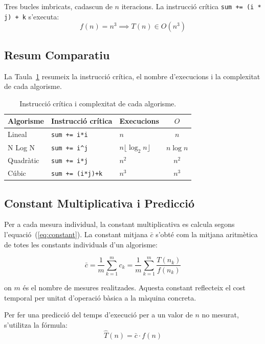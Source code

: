 \documentclass[conference,compsoc]{IEEEtran}
\begin{document}
Tres bucles imbricats, cadascun de $n$ iteracions. La instrucció crítica
\texttt{sum += (i * j) + k} s'executa:
\begin{equation}
f(n) = n^3 \implies T(n) \in O(n^3)
\end{equation}

\subsection{Resum Comparatiu}

La Taula~\ref{tab:critical} resumeix la instrucció crítica, el nombre
d'execucions i la complexitat de cada algorisme.

\begin{table}[H]
\caption{Instrucció crítica i complexitat de cada algorisme.\label{tab:critical}}
\centering
\begin{tabular}{lllc}
\toprule
Algorisme & Instrucció crítica & Execucions & $O$ \\
\midrule
Lineal     & \texttt{sum += i*i}   & $n$                           & $n$ \\
N Log N    & \texttt{sum += i\^{}j}  & $n \lfloor\log_2 n\rfloor$   & $n\log n$ \\
Quadràtic  & \texttt{sum += i*j}   & $n^2$                         & $n^2$ \\
Cúbic      & \texttt{sum += (i*j)+k} & $n^3$                       & $n^3$ \\
\bottomrule
\end{tabular}
\end{table}

\subsection{Constant Multiplicativa i Predicció}

Per a cada mesura individual, la constant multiplicativa es calcula
segons l'equació~(\ref{eq:constant}). La constant mitjana $\bar{c}$
s'obté com la mitjana aritmètica de totes les constants individuals
d'un algorisme:

\begin{equation}
\bar{c} = \frac{1}{m} \sum_{k=1}^{m} c_k = \frac{1}{m} \sum_{k=1}^{m}
\frac{T(n_k)}{f(n_k)}
\end{equation}

on $m$ és el nombre de mesures realitzades. Aquesta constant reflecteix el
cost temporal per unitat d'operació bàsica a la màquina concreta.

Per fer una predicció del temps d'execució per a un valor de $n$ no
mesurat, s'utilitza la fórmula:
\begin{equation}
\hat{T}(n) = \bar{c} \cdot f(n)
\end{equation}
\end{document}
